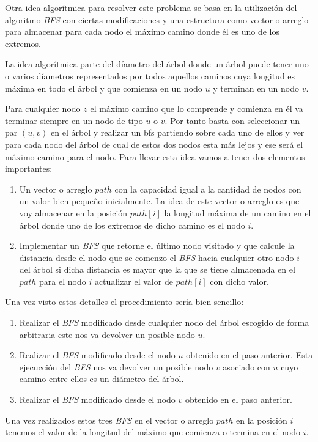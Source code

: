 Otra idea algorítmica para resolver este problema se basa en la utilización del algoritmo \emph{BFS} con ciertas modificaciones y una estructura como vector o arreglo para almacenar para cada nodo el máximo camino donde él es uno de los extremos.

La idea algorítmica parte del díametro del árbol donde un árbol puede tener uno o varios díametros representados por todos aquellos caminos cuya longitud es máxima en todo el árbol y que comienza en un nodo $u$ y terminan en un nodo $v$. 

Para cualquier nodo $z$ el máximo camino que lo comprende y comienza en él va terminar siempre en un nodo de tipo $u$ o $v$. Por tanto basta con seleccionar un par $(u,v)$ en el árbol y realizar un bfs partiendo sobre cada uno de ellos y ver para cada nodo del árbol de cual de estos dos nodos esta más lejos y ese será el máximo camino para el nodo. Para llevar esta idea vamos a tener dos elementos importantes:

\begin{enumerate}
	\item Un vector o arreglo $path$ con la capacidad igual a la cantidad de nodos con un valor bien pequeño inicialmente. La idea de este vector o arreglo es que voy almacenar en la posición $path[i]$ la longitud máxima de un camino en el árbol donde uno de los extremos de dicho camino es el nodo $i$.
	\item Implementar un \emph{BFS} que retorne el último nodo visitado y que calcule la distancia desde el nodo que se comenzo el \emph{BFS} hacia cualquier otro nodo $i$ del árbol si dicha distancia es mayor que la que se tiene almacenada en el $path$ para el nodo $i$ actualizar el valor de $path[i]$ con dicho valor.
\end{enumerate}

Una vez visto estos detalles el procedimiento sería bien sencillo:

\begin{enumerate}
\item Realizar el \emph{BFS} modificado desde cualquier nodo del árbol escogido de forma arbitraria este nos va devolver un posible nodo $u$.
\item Realizar el \emph{BFS} modificado desde el nodo $u$ obtenido en el paso anterior. Esta ejecucción del \emph{BFS} nos va devolver un posible nodo $v$ asociado con $u$ cuyo camino entre ellos es un diámetro del árbol.
\item Realizar el \emph{BFS} modificado desde el nodo $v$ obtenido en el paso anterior.
 
\end{enumerate}

Una vez realizados estos tres \emph{BFS} en el vector o arreglo $path$ en la posición $i$ tenemos el valor de la longitud del máximo que comienza o termina en el nodo $i$. 